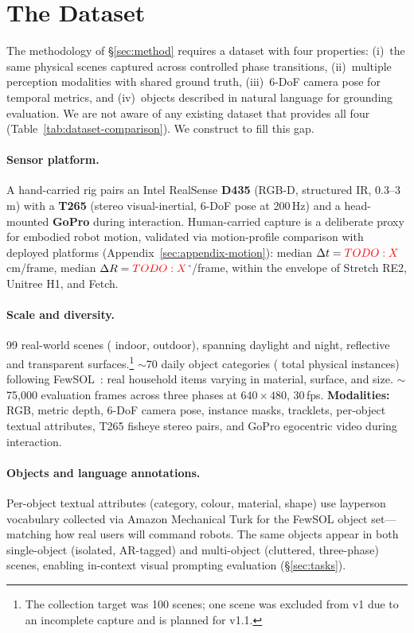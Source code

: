 \section{The \coolname{} Dataset}\label{sec:dataset}

The methodology of \S\ref{sec:method} requires a dataset with four properties:
(i)~the same physical scenes captured across controlled phase transitions,
(ii)~multiple perception modalities with shared ground truth,
(iii)~6-DoF camera pose for temporal metrics, and
(iv)~objects described in natural language for grounding evaluation.
We are not aware of any existing dataset that provides all four (Table~\ref{tab:dataset-comparison}).
We construct \coolname{} to fill this gap.

\paragraph{Sensor platform.}
A hand-carried rig pairs an Intel RealSense \textbf{D435} (RGB-D, structured IR, 0.3--3\,m) with a \textbf{T265} (stereo visual-inertial, 6-DoF pose at 200\,Hz) and a head-mounted \textbf{GoPro} during interaction.
Human-carried capture is a deliberate proxy for embodied robot motion, validated via motion-profile comparison with deployed platforms (Appendix~\ref{sec:appendix-motion}):
median $\Delta t = \textcolor{red}{TODO: X}$\,cm/frame, median $\Delta R = \textcolor{red}{TODO: X}$$^\circ$/frame, within the envelope of Stretch RE2, Unitree H1, and Fetch.

\paragraph{Scale and diversity.}
99 real-world scenes ( indoor,  outdoor), spanning daylight and night, reflective and transparent surfaces.\footnote{The collection target was 100 scenes; one scene was excluded from v1 due to an incomplete capture and is planned for v1.1.}
${\sim}$70 daily object categories ( total physical instances) following FewSOL~\citep{padalunkal2023fewsol}: real household items varying in material, surface, and size.
${\sim}$75{,}000 evaluation frames across three phases at $640 \times 480$, 30\,fps.
\textbf{Modalities:} RGB, metric depth, 6-DoF camera pose, instance masks, tracklets, per-object textual attributes, T265 fisheye stereo pairs, and GoPro egocentric video during interaction.

\paragraph{Objects and language annotations.}
Per-object textual attributes (category, colour, material, shape) use layperson vocabulary collected via Amazon Mechanical Turk for the FewSOL object set---matching how real users will command robots.
The same objects appear in both single-object (isolated, AR-tagged) and multi-object (cluttered, three-phase) scenes, enabling in-context visual prompting evaluation (\S\ref{sec:tasks}).

